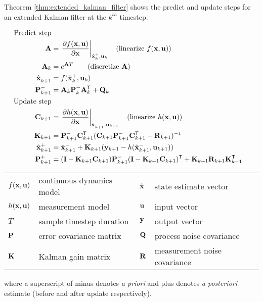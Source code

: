 Theorem \ref{thm:extended_kalman_filter} shows the predict and update steps for
an extended Kalman filter at the $k^{th}$ timestep.
\begin{theorem}
  \label{thm:extended_kalman_filter}
  \begin{align}
    \text{Predict step} \nonumber \\
    \mathbf{A} &= \left.\frac{\partial f(\mathbf{x}, \mathbf{u})}{\partial \mathbf{x}}
               \right|_{\hat{\mathbf{x}}_k^+, \mathbf{u}_k}
      \quad\text{(linearize $f(\mathbf{x}, \mathbf{u})$)} \\
    \mathbf{A}_k &= e^{\mathbf{A}T} \qquad\text{(discretize $\mathbf{A}$)} \\
    \hat{\mathbf{x}}_{k+1}^- &= f(\hat{\mathbf{x}}_k^+, \mathbf{u}_k) \\
    \mathbf{P}_{k+1}^- &= \mathbf{A}_k \mathbf{P}_k^- \mathbf{A}_k^\mathsf{T} + \mathbf{Q}_k \\
    \text{Update step} \nonumber \\
    \mathbf{C}_{k+1} &= \left.\frac{\partial h(\mathbf{x}, \mathbf{u})}{\partial \mathbf{x}}
                     \right|_{\hat{\mathbf{x}}_{k+1}^-, \mathbf{u}_{k+1}}
      \quad\text{(linearize $h(\mathbf{x}, \mathbf{u})$)} \\
    \mathbf{K}_{k+1} &= \mathbf{P}_{k+1}^- \mathbf{C}_{k+1}^\mathsf{T}
      (\mathbf{C}_{k+1}\mathbf{P}_{k+1}^- \mathbf{C}_{k+1}^\mathsf{T} + \mathbf{R}_{k+1})^{-1} \\
    \hat{\mathbf{x}}_{k+1}^+ &=
      \hat{\mathbf{x}}_{k+1}^- + \mathbf{K}_{k+1}(\mathbf{y}_{k+1} -
      h(\hat{\mathbf{x}}_{k+1}^-, \mathbf{u}_{k+1})) \\
    \mathbf{P}_{k+1}^+ &= (\mathbf{I} - \mathbf{K}_{k+1}\mathbf{C}_{k+1})\mathbf{P}_{k+1}^-
      (\mathbf{I} - \mathbf{K}_{k+1}\mathbf{C}_{k+1})^\mathsf{T} +
      \mathbf{K}_{k+1}\mathbf{R}_{k+1}\mathbf{K}_{k+1}^\mathsf{T}
  \end{align}
  \begin{figurekey}
    \begin{tabular}{llll}
      $f(\mathbf{x}, \mathbf{u})$ & continuous dynamics model & $\hat{\mathbf{x}}$ & state estimate vector \\
      $h(\mathbf{x}, \mathbf{u})$ & measurement model & $\mathbf{u}$ & input vector \\
      $T$ & sample timestep duration & $\mathbf{y}$ & output vector \\
      $\mathbf{P}$ & error covariance matrix & $\mathbf{Q}$ & process noise covariance \\
      $\mathbf{K}$ & Kalman gain matrix & $\mathbf{R}$ & measurement noise covariance \\
    \end{tabular}
  \end{figurekey}

  where a superscript of minus denotes \textit{a priori} and plus denotes
  \textit{a posteriori} estimate (before and after update respectively).
\end{theorem}
